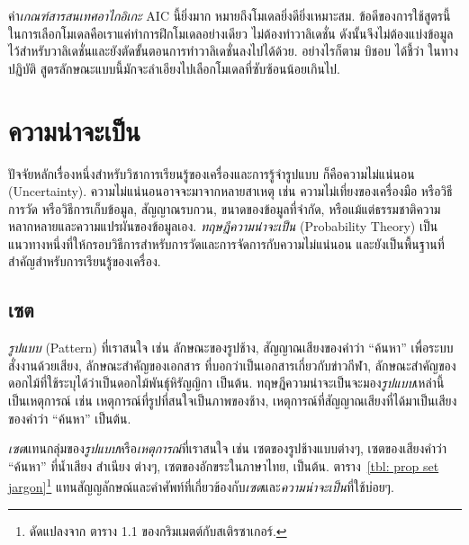 ค่า\textit{เกณฑ์สารสนเทศอาไกอิเกะ} $\mathrm{AIC}$ นี้ยิ่งมาก หมายถึงโมเดลยิ่งดียิ่งเหมาะสม.
%
ข้อดีของการใช้สูตรนี้ในการเลือกโมเดลคือเราแค่ทำการฝึกโมเดลอย่างเดียว ไม่ต้องทำวาลิเดชั่น 
ดังนั้นจึงไม่ต้องแบ่งข้อมูลไว้สำหรับวาลิเดชั่นและยังตัดขั้นตอนการทำวาลิเดชั่นลงไปได้ด้วย.
อย่างไรก็ตาม บิชอบ\cite{Bishop2006a} ได้ชี้ว่า ในทางปฏิบัติ 
สูตรลักษณะแบบนี้มักจะลำเอียงไปเลือกโมเดลที่ซับซ้อนน้อยเกินไป.

\section{ความน่าจะเป็น}
\label{sec: Probability}
 

ปัจจัยหลักเรื่องหนึ่งสำหรับวิชาการเรียนรู้ของเครื่องและการรู้จำรูปแบบ ก็คือความไม่แน่นอน (Uncertainty).
ความไม่แน่นอนอาจจะมาจากหลายสาเหตุ เช่น ความไม่เที่ยงของเครื่องมือ หรือวิธีการวัด หรือวิธีการเก็บข้อมูล, สัญญาณรบกวน, ขนาดของข้อมูลที่จำกัด, หรือแม้แต่ธรรมชาติความหลากหลายและความแปรผันของข้อมูลเอง.
\textit{ทฤษฎีความน่าจะเป็น} (Probability Theory) 
เป็นแนวทางหนึ่งที่ให้กรอบวิธีการสำหรับการวัดและการจัดการกับความไม่แน่นอน 
และยังเป็นพื้นฐานที่สำคัญสำหรับการเรียนรู้ของเครื่อง.

\subsection{เซต}
\label{sec: sets}
 

\textit{รูปแบบ} (Pattern) ที่เราสนใจ เช่น ลักษณะของรูปช้าง, สัญญาณเสียงของคำว่า ``ค้นหา'' เพื่อระบบสั่งงานด้วยเสียง, ลักษณะสำคัญของเอกสาร ที่บอกว่าเป็นเอกสารเกี่ยวกับข่าวกีฬา,
ลักษณะสำคัญของดอกไม้ที่ใช้ระบุได้ว่าเป็นดอกไม้พันธ์ุหิรัญญิกา เป็นต้น.
ทฤษฎีความน่าจะเป็นจะมอง\textit{รูปแบบ}เหล่านี้เป็นเหตุการณ์ เช่น เหตุการณ์ที่รูปที่สนใจเป็นภาพของช้าง, เหตุการณ์ที่สัญญาณเสียงที่ได้มาเป็นเสียงของคำว่า ``ค้นหา'' เป็นต้น.

\textit{เซต}แทนกลุ่มของ\textit{รูปแบบ}หรือ\textit{เหตุการณ์}ที่เราสนใจ เช่น เซตของรูปช้างแบบต่างๆ, เซตของเสียงคำว่า ``ค้นหา'' ที่น้ำเสียง สำเนียง ต่างๆ, 
เซตของอักขระในภาษาไทย, เป็นต้น.
ตาราง~\ref{tbl: prop set jargon}\footnote{
ดัดแปลงจาก ตาราง 1.1 ของกริมเมตต์กับสเติรซาเกอร์\cite{GrimmettStirzaker2001a}.
} แทนสัญญลักษณ์และคำศัพท์ที่เกี่ยวข้องกับ\textit{เซต}และ\textit{ความน่าจะเป็น}ที่ใช้บ่อยๆ.

